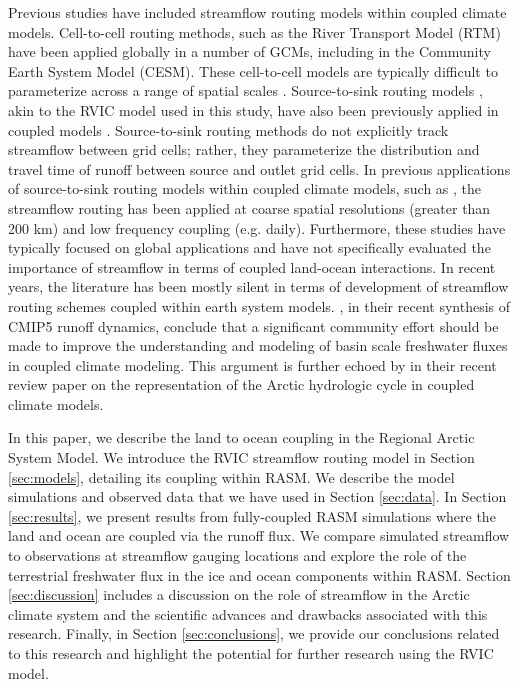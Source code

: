 \documentclass[jgrga, draft]{agutex}
\begin{document}
\begin{article}
Previous studies have included streamflow routing models within coupled climate models.
Cell-to-cell routing methods, such as the River Transport Model (RTM) \citep{Branstetter_2003} have been applied globally in a number of GCMs, including in the Community Earth System Model (CESM).
These cell-to-cell models are typically difficult to parameterize across a range of spatial scales \citep{Sushama_2004}.
Source-to-sink routing models \citep[e.g.][]{Lohmann_1996,Naden_1992}, akin to the RVIC model used in this study, have also been previously applied in coupled models \citep[e.g.][]{Olivera_2000}.
Source-to-sink routing methods do not explicitly track streamflow between grid cells; rather, they parameterize the distribution and travel time of runoff between source and outlet grid cells.
In previous applications of source-to-sink routing models within coupled climate models, such as \citet[][]{Olivera_2000}, the streamflow routing has been applied at coarse spatial resolutions (greater than 200 km) and low frequency coupling (e.g. daily).
Furthermore, these studies have typically focused on global applications and have not specifically evaluated the importance of streamflow in terms of coupled land-ocean interactions.
In recent years, the literature has been mostly silent in terms of development of streamflow routing schemes coupled within earth system models.
\citet{Bring_2015}, in their recent synthesis of CMIP5 runoff dynamics, conclude that a significant community effort should be made to improve the understanding and modeling of basin scale freshwater fluxes in coupled climate modeling.
This argument is further echoed by \citet{Lique_2015} in their recent review paper on the representation of the Arctic hydrologic cycle in coupled climate models.

In this paper, we describe the land to ocean coupling in the Regional Arctic System Model.
We introduce the RVIC streamflow routing model in Section \ref{sec:models}, detailing its coupling within RASM.
We describe the model simulations and observed data that we have used in Section \ref{sec:data}.
In Section \ref{sec:results}, we present results from fully-coupled RASM simulations where the land and ocean are coupled via the runoff flux.
We compare simulated streamflow to observations at streamflow gauging locations and explore the role of the terrestrial freshwater flux in the ice and ocean components within RASM.
Section \ref{sec:discussion} includes a discussion on the role of streamflow in the Arctic climate system and the scientific advances and drawbacks associated with this research.
Finally, in Section \ref{sec:conclusions}, we provide our conclusions related to this research and highlight the potential for further research using the RVIC model.


\end{article}
\end{document}
